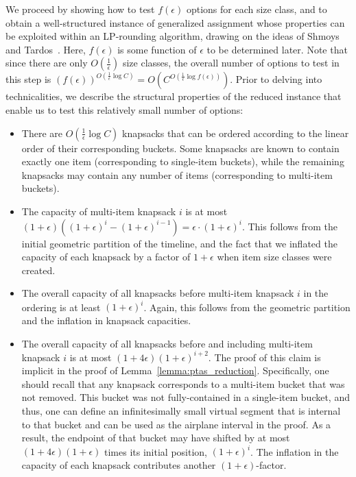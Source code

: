 \documentclass[11pt]{article}
\theoremstyle{plain}
\theoremstyle{definition}
\begin{document}
We proceed by showing how to test $f(\epsilon)$ options for each size class, and to obtain a well-structured instance of generalized assignment whose properties can be exploited within an LP-rounding algorithm, drawing on the ideas of Shmoys and Tardos~\cite{ShmoysT93}. Here, $f(\epsilon)$ is some function of $\epsilon$ to be determined later. Note that since there are only $O( \frac{ 1 }{ \epsilon } )$ size classes, the overall number of options to test in this step is $(f(\epsilon))^{O( \frac{ 1 }{ \epsilon } \log C )} = O( C^{O( \frac{ 1 }{ \epsilon } \log f(\epsilon))} )$. Prior to delving into technicalities, we describe the structural properties of the reduced instance that enable us to test this relatively small number of options:
\begin{itemize} \label{items:properties_instance}
\item There are $O( \frac{ 1 }{ \epsilon } \log C)$ knapsacks that can be ordered according to the linear order of their corresponding buckets. Some knapsacks are known to contain exactly one item (corresponding to single-item buckets), while the remaining knapsacks may contain any number of items (corresponding to multi-item buckets).

\item The capacity of multi-item knapsack $i$ is at most $(1+\epsilon)((1+\epsilon)^{i} - (1+\epsilon)^{i-1}) = \epsilon \cdot (1+\epsilon)^{i}$. This follows from the initial geometric partition of the timeline, and the fact that we inflated the capacity of each knapsack by a factor of $1+\epsilon$ when item size classes were created.

\item The overall capacity of all knapsacks before multi-item knapsack $i$ in the ordering is at least $(1+\epsilon)^{i}$. Again, this follows from the geometric partition and the inflation in knapsack capacities.

\item The overall capacity of all knapsacks before and including multi-item knapsack $i$ is at most $(1+ 4 \epsilon)(1+\epsilon)^{i+2}$. The proof of this claim is implicit in the proof of Lemma~\ref{lemma:ptas_reduction}. Specifically, one should recall that any knapsack corresponds to a multi-item bucket that was not removed. This bucket was not fully-contained in a single-item bucket, and thus, one can define an infinitesimally small virtual segment that is internal to that bucket and can be used as the airplane interval in the proof. As a result, the endpoint of that bucket may have shifted by at most $(1+ 4 \epsilon)(1+\epsilon)$ times its initial position, $(1+\epsilon)^i$. The inflation in the capacity of each knapsack contributes another $(1+\epsilon)$-factor.
\end{itemize}
\end{document}
